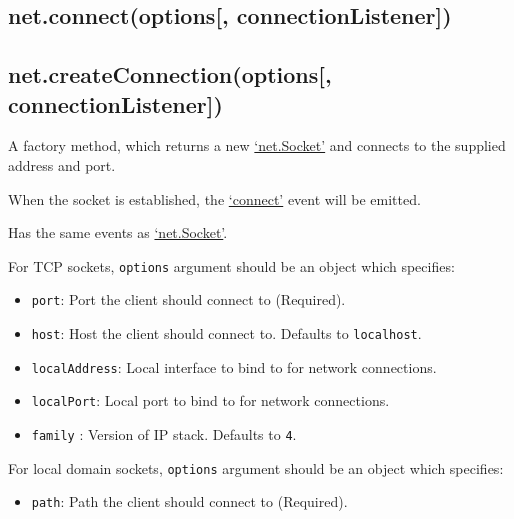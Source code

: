 \begin{Shaded}
\begin{Highlighting}[]
\end{Highlighting}
\end{Shaded}

\subsection{net.connect(options{[},
connectionListener{]})}\label{net.connectoptions-connectionlistener}

\subsection{net.createConnection(options{[},
connectionListener{]})}\label{net.createconnectionoptions-connectionlistener}

A factory method, which returns a new
\hyperref[netux5fclassux5fnetux5fsocket]{`net.Socket'} and connects to
the supplied address and port.

When the socket is established, the
\hyperref[netux5feventux5fconnect]{`connect'} event will be emitted.

Has the same events as
\hyperref[netux5fclassux5fnetux5fsocket]{`net.Socket'}.

For TCP sockets, \texttt{options} argument should be an object which
specifies:

\begin{itemize}
\item
  \texttt{port}: Port the client should connect to (Required).
\item
  \texttt{host}: Host the client should connect to. Defaults to
  \texttt{\textquotesingle{}localhost\textquotesingle{}}.
\item
  \texttt{localAddress}: Local interface to bind to for network
  connections.
\item
  \texttt{localPort}: Local port to bind to for network connections.
\item
  \texttt{family} : Version of IP stack. Defaults to \texttt{4}.
\end{itemize}

For local domain sockets, \texttt{options} argument should be an object
which specifies:

\begin{itemize}
\itemsep1pt\parskip0pt
\item
  \texttt{path}: Path the client should connect to (Required).
\end{itemize}

